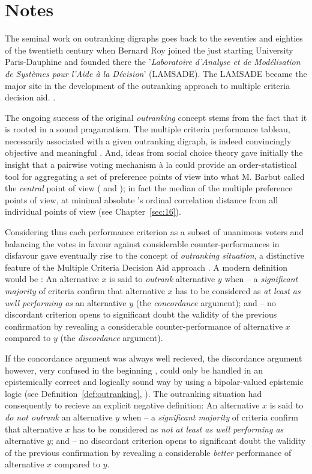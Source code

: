 \section*{Notes}

The seminal work on outranking digraphs goes back to the seventies and eighties of the twentieth century when Bernard Roy  joined the just starting University Paris-Dauphine and founded there the '\emph{Laboratoire d’Analyse et de Modélisation de Systèmes pour l’Aide à la Décision}' (LAMSADE). The LAMSADE became the major site in the development of the outranking approach to multiple criteria decision aid. \citep*{ROY-1993}.

The ongoing success of the original \emph{outranking} concept stems from the fact that it is rooted in a sound pragamatism. The multiple criteria performance tableau, necessarily associated with a given outranking digraph, is indeed convincingly objective and meaningful \citep{ROY-1991}. And, ideas from social choice theory gave initially the insight that a pairwise voting mechanism à la \Condorcet could provide an order-statistical tool for aggregating a set of preference points of view into what M. Barbut called the \emph{central} \Condorcet point of view (\citet{CON-1784} and \citet{BAR-1980}); in fact the median of the multiple preference points of view, at minimal absolute \Kendall's ordinal correlation distance from all individual points of view (see Chapter~\ref{sec:16}).

Considering thus each performance criterion as a subset of unanimous voters and balancing the votes in favour against considerable counter-performances in disfavour gave eventually rise to the concept of \emph{outranking situation}, a distinctive feature of the Multiple Criteria Decision Aid approach \citep{BIS-2015}.  A modern definition would be : An alternative $x$ is said to \emph{outrank} alternative $y$ when – a \emph{significant majority} of criteria confirm that alternative $x$ has to be considered as \emph{at least as well performing as} an alternative $y$ (the \emph{concordance} argument); and – no discordant criterion opens to significant doubt the validity of the previous confirmation by revealing a considerable counter-performance of alternative $x$ compared to $y$ (the \emph{discordance} argument).

If the concordance argument was always well recieved, the discordance argument however, very confused in the beginning \citep{ROY-1966}, could only be handled in an epistemically correct and logically sound way by using a bipolar-valued epistemic logic (see Definition~\ref{def:outranking}, \citet{BIS-2013}). The outranking situation had consequently to recieve an explicit negative definition: An alternative $x$ is said to \emph{do not outrank} an alternative $y$ when – a \emph{significant majority} of criteria confirm that alternative $x$ has to be considered as \emph{not at least as well performing as} alternative $y$; and – no discordant criterion opens to significant doubt the validity of the previous confirmation by revealing a considerable \emph{better} performance of alternative $x$ compared to $y$.

